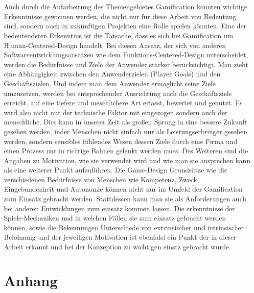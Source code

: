 \documentclass[a4paper,12pt,twoside]{scrartcl}
\begin{document}
\\\\
Auch durch die Aufarbeitung des Themengebietes Gamification konnten wichtige Erkenntnisse gewonnen werden, die nicht nur für diese Arbeit von Bedeutung sind, sondern auch in zukünftigen Projekten eine Rolle spielen könnten. Eine der bedeutendsten Erkenntnis ist die Tatsache, dass es sich bei Gamification um Human-Centered-Design handelt. Bei diesen Ansatz, der sich von anderen Softwareentwicklungsansätzen wie dem Funktions-Centered-Design unterscheidet, werden die Bedürfnisse und Ziele der Anwender stärker berücksichtigt. Man zieht eine Abhängigkeit zwischen den Anwenderzielen (Player Goals) und den Geschäftszielen. Und indem man dem Anwender ermöglicht seine Ziele umzusetzen, werden bei entsprechender Ausrichtung auch die Geschäftsziele erreicht.  auf eine tiefere und meschlichere Art erfasst, bewertet und genutzt. Es wird also nicht nur der technische Faktor mit eingezogen sondern auch der menschliche. Dies kann in unserer Zeit als großen Sprung in eine bessere Zukunft gesehen werden, inder Menschen nicht einfach nur als Leistungserbringer gesehen werden, sondern sensibles fühlendes Wesen dessen Ziele durch eine Firma und einen Prozess nur in richtige Bahnen gelenkt werden muss. Des Weiteren sind die Angaben zu Motivation, wie sie verwendet wird und wie man sie ansprechen kann als eine weiterer Punkt aufzuführen. Die Game-Design Grundsätze wie die verschiedenen Bedürfnisse von Menschen wie Kompetenz, Zweck, Eingebundenheit und Autonomie können nicht nur im Umfeld der Gamification zum Einsatz gebracht werden. Stattdessen kann man sie als Anforderungen auch bei anderen Entwicklungen zum einsatz kommen lassen. Die erkenntnisse der Spiele-Mechaniken und in welchen Fällen sie zum einsatz gebracht werden können, sowie die Bekennungen Unterschiede von extrinsischer und intrinsischer Belohnung und der jeweiligen Motivation ist ebenfalsl ein Punkt der in dieser Arbeit erkannt und bei der Konzeption zu wichtigen einstz gebracht wurde. 

\newpage
\section{Anhang} 
%
\newpage
\listoftables
\listoffigures
\newpage

\end{document}
